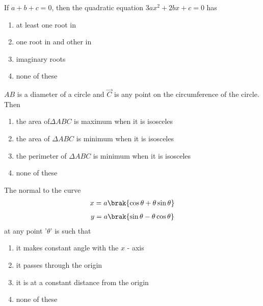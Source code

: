 \iffalse
\title{Assignment}
\author{ee24btech11056-S.Kavya Anvitha}
\section{mcq-single} 
\fi


\item If $a+b+c = 0$, then the quadratic equation $3ax^2 + 2bx + c = 0$
has \hfill{}
\begin{enumerate}
	\item at least one root in
	\item one root in  and other in 
        \item imaginary roots
	\item none of these
\end{enumerate}

 \item $AB$ is a diameter of a circle and $\vec C$ is any point on the
circumference of the circle. Then
\hfill{}
\begin{enumerate}
	\item the area of$\Delta ABC$ is maximum when it is isosceles
	\item the area of $\Delta ABC$ is minimum when it is isosceles
	\item the perimeter of $\Delta ABC$ is minimum when it is isosceles
	\item none of these
\end{enumerate}

\item The normal to the curve 
\begin{align*}x = a\brak{\cos \theta + \theta\sin \theta}
\end{align*}
\begin{align*}y = a\brak{\sin \theta - \theta\cos \theta}
\end{align*}
at any point '$\theta$' is such that \hfill{}
\begin{enumerate}
	\item it makes  constant angle with the $x$ - axis
	\item it passes through the origin
	\item it is at a constant distance from the origin
	\item none of these
\end{enumerate}

